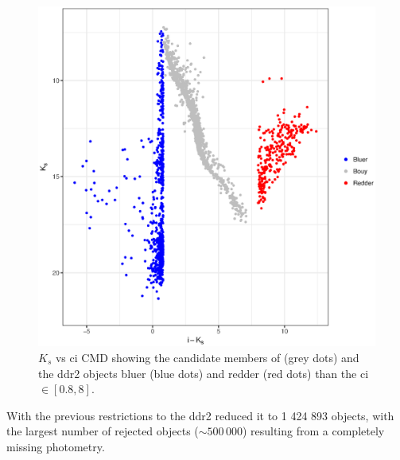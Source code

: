\begin{figure}[ht!]
\begin{center}
\includegraphics[width=\textwidth]{background/Figures/ColourCuts.eps}
\caption{$K_s$ vs \gls{ci} CMD showing the candidate members of \citet{Bouy2015}(grey dots) and the \gls{ddr2} objects bluer (blue dots) and redder (red dots) than the \gls{ci}$\in[0.8,8]$.}
\label{fig:incompatible_objects}
\end{center}
\end{figure}


With the previous restrictions to the \gls{ddr2} reduced it to 1 424 893 objects, with the largest number of rejected objects ($\sim 500\, 000$) resulting from a completely missing photometry.

